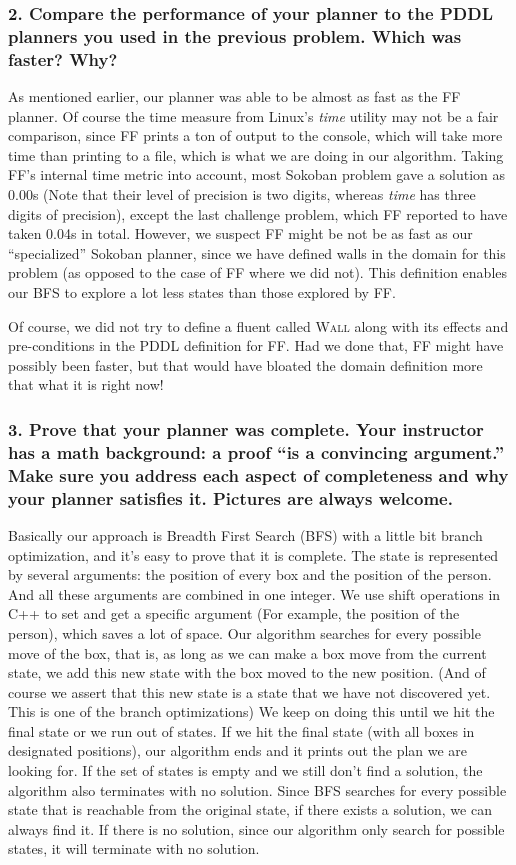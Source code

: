 \documentclass[10pt, letter]{article}
\begin{document}
\subsubsection*{2. Compare the performance of your planner to the PDDL planners you used in the previous
problem. Which was faster? Why?}
As mentioned earlier, our planner was able to be almost as fast as the FF planner. Of course the time measure from Linux's \textit{time} utility may not be a fair comparison, since FF prints a ton of output to the console, which will take more time than printing to a file, which is what we are doing in our algorithm. Taking FF's internal time metric into account, most Sokoban problem gave a solution as 0.00s (Note that their level of precision is two digits, whereas \textit{time} has three digits of precision), except the last challenge problem, which FF reported to have taken 0.04s in total. However, we suspect FF might be not be as fast as our ``specialized'' Sokoban planner, since we have defined walls in the domain for this problem (as opposed to the case of FF where we did not). This definition enables our BFS to explore a lot less states than those explored by FF. 

Of course, we did not try to define a fluent called \textsc{Wall} along with its effects and pre-conditions in the PDDL definition for FF. Had we done that, FF might have possibly been faster, but that would have bloated the domain definition more that what it is right now!

\subsubsection*{3. Prove that your planner was complete. Your instructor has a math background: a proof ``is
a convincing argument.'' Make sure you address each aspect of completeness and why your
planner satisfies it. Pictures are always welcome.}
Basically our approach is Breadth First Search (BFS) with a little bit branch optimization, and it's easy to prove that it is complete.
The state is represented by several arguments: the position of every box and the position of the person.
And all these arguments are combined in one integer.
We use shift operations in C++ to set and get a specific argument (For example, the position of the person), which saves a lot of space.
Our algorithm searches for every possible move of the box, that is, as long as we can make a box move from the current state, we add this new state with the box moved to the new position. 
(And of course we assert that this new state is a state that we have not discovered yet. This is one of the branch optimizations)
We keep on doing this until we hit the final state or we run out of states.
If we hit the final state (with all boxes in designated positions), our algorithm ends and it prints out the plan we are looking for.
If the set of states is empty and we still don't find a solution, the algorithm also terminates with no solution.
Since BFS searches for every possible state that is reachable from the original state, if there exists a solution, we can always find it.
If there is no solution, since our algorithm only search for possible states, it will terminate with no solution.
\end{document}

